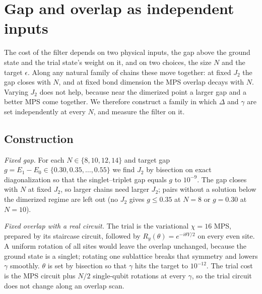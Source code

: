\documentclass[aps,pra,twocolumn,superscriptaddress,nofootinbib]{revtex4-2}
\begin{document}
\section{Gap and overlap as independent inputs}
\label{sec:gapov}

The cost of the filter depends on two physical inputs, the gap above the ground state and the trial
state's weight on it, and on two choices, the size $N$ and the target $\epsilon$. Along any natural family
of chains these move together: at fixed $J_2$ the gap closes with $N$, and at fixed bond dimension the MPS
overlap decays with $N$. Varying $J_2$ does not help, because near the dimerized point a larger gap and a
better MPS come together. We therefore construct a family in which $\Delta$ and $\gamma$ are set
independently at every $N$, and measure the filter on it.

\subsection{Construction}

\emph{Fixed gap.} For each $N\in\{8,10,12,14\}$ and target gap $g=E_1-E_0\in\{0.30,0.35,\dots,0.55\}$ we
find $J_2$ by bisection on exact diagonalization so that the singlet--triplet gap equals $g$ to $10^{-9}$.
The gap closes with $N$ at fixed $J_2$, so larger chains need larger $J_2$; pairs without a solution below
the dimerized regime are left out (no $J_2$ gives $g\le0.35$ at $N=8$ or $g=0.30$ at $N=10$).

\emph{Fixed overlap with a real circuit.} The trial is the variational $\chi=16$ MPS, prepared by its
staircase circuit, followed by $R_y(\theta)=e^{-i\theta Y/2}$ on every even site. A uniform rotation of all
sites would leave the overlap unchanged, because the ground state is a singlet; rotating one sublattice
breaks that symmetry and lowers $\gamma$ smoothly. $\theta$ is set by bisection so that $\gamma$ hits the
target to $10^{-12}$. The trial cost is the MPS circuit plus $N/2$ single-qubit rotations at every $\gamma$,
so the trial circuit does not change along an overlap scan.
\end{document}
